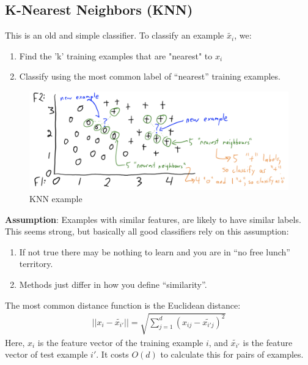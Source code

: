 \documentclass{article}
\theoremstyle{definition}
\begin{document}
\subsection*{K-Nearest Neighbors (KNN)}
This is an old and simple classifier. To classify an example $ \tilde{x_i} $, we:
\begin{enumerate}
	\item Find the {\color{OliveGreen} 'k' training examples that are "nearest"} to $ x_i $
	\item Classify using the {\color{OliveGreen} most common label} of “nearest” training examples.
\end{enumerate}
\begin{figure}[H]
	\centering
	\includegraphics[width = 5in]{Pic2}
	\caption{KNN example}
\end{figure}
\textbf{Assumption}: {\color{OliveGreen} Examples with similar features, are likely to have similar labels}. This seems strong, but basically {\color{OliveGreen} all good classifiers rely on this assumption}:
\begin{enumerate}[label=-]
	\item If not true there may be nothing to learn and you are in “no free lunch” territory.
	\item Methods just differ in how you define “similarity”.
\end{enumerate}
The most common distance function is the {\color{blue} Euclidean distance}:
\begin{align*}
||x_i - \tilde{x_{i'}} || = \sqrt{\sum_{j = 1}^{d}(x_{ij} - \tilde{x_{i'j}})^2}
\end{align*}
Here, $ x_i $ is the feature vector of the training example $ i $, and $ \tilde{x_{i'}} $ is the feature vector of test example $ i' $. It costs $ O(d) $ to calculate this for pairs of examples.
\end{document}
